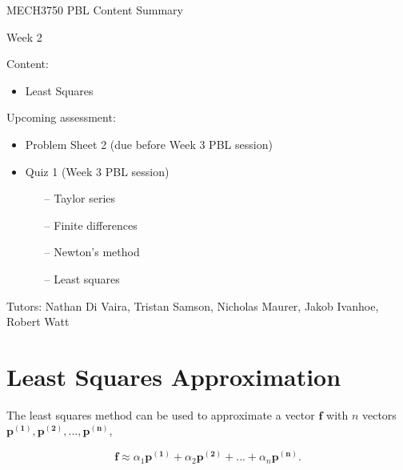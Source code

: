 \documentclass[12pt]{article}
\begin{document}
\begin{center}
{\Huge   MECH3750 PBL Content Summary}

\vspace{6mm}

{\Huge  Week 2}

\end{center}

\vspace{6mm}

{\Large Content:}
{\begin{itemize}
	\item Least Squares
\end{itemize}}

\vspace{4mm}

{\Large Upcoming assessment:}
{\begin{itemize}
	\item Problem Sheet 2 (due before Week 3 PBL session)
	\item Quiz 1 (Week 3 PBL session)
	\begin{itemize}
		\item[--] Taylor series
		\item[--] Finite differences
		\item[--] Newton's method
		\item[--] Least squares
	\end{itemize}
\end{itemize}}

\vspace{4mm}

{Tutors: Nathan Di Vaira, Tristan Samson, Nicholas Maurer, Jakob Ivanhoe, Robert Watt}


\pagebreak

\section{Least Squares Approximation}

\vspace{4mm}

The least squares method can be used to approximate a vector $\mathbf{f}$ with $n$ vectors $\mathbf{p^{(1)}}, \mathbf{p^{(2)}}, ... , \mathbf{p^{(n)}}$,

\vspace{2mm}

$$\mathbf{f} \approx \alpha_1 \mathbf{p^{(1)}} + \alpha_2 \mathbf{p^{(2)}} + ... + \alpha_n \mathbf{p^{(n)}}.$$
\end{document}
